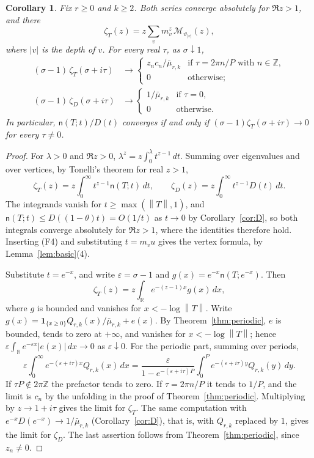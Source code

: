 \documentclass[11pt]{article}
\newtheorem{corollary}[theorem]{Corollary}
\theoremstyle{definition}
\theoremstyle{remark}
\newcommand{\Z}{\mathbb Z}
\newcommand{\R}{\mathbb R}
\newcommand{\one}{\mathbf 1}
\newcommand{\ncount}{\mathsf n}
\newcommand{\norm}[1]{\left\lVert #1\right\rVert}
\begin{document}
\begin{corollary}\label{cor:zeta}
Fix $r\ge0$ and $k\ge2$. Both series converge absolutely for $\Re z>1$,
and there
\[
 \zeta_T(z)=z\sum_vm_v^z\,\mathcal M_{\vartheta_{|v|}}(z),
\]
where $|v|$ is the depth of $v$. For every real $\tau$, as $\sigma\downarrow1$,
\begin{align*}
 (\sigma-1)\,\zeta_T(\sigma+i\tau)&\longrightarrow
 \begin{cases}z_nc_n/\bar\mu_{r,k}&\text{if }\tau=2\pi n/P\text{ with }n\in\Z,\\
 0&\text{otherwise};\end{cases}\\
 (\sigma-1)\,\zeta_D(\sigma+i\tau)&\longrightarrow
 \begin{cases}1/\bar\mu_{r,k}&\text{if }\tau=0,\\
 0&\text{otherwise}.\end{cases}
\end{align*}
In particular, $\ncount(T;t)/D(t)$ converges if and only if
$(\sigma-1)\zeta_T(\sigma+i\tau)\to0$ for every $\tau\ne0$.
\end{corollary}
\begin{proof}
For $\lambda>0$ and $\Re z>0$, $\lambda^z=z\int_0^\lambda t^{z-1}\,dt$.
Summing over eigenvalues and over vertices, by Tonelli's theorem for
real $z>1$,
\[
 \zeta_T(z)=z\int_0^\infty t^{z-1}\ncount(T;t)\,dt,\qquad
 \zeta_D(z)=z\int_0^\infty t^{z-1}D(t)\,dt.
\]
The integrands vanish for $t\ge\max(\norm T,1)$, and
$\ncount(T;t)\le D((1-\theta)t)=O(1/t)$ as $t\to0$ by
Corollary~\ref{cor:D}, so both integrals converge absolutely for
$\Re z>1$, where the identities therefore hold. Inserting (F4) and
substituting $t=m_vu$ gives the vertex formula, by Lemma~\ref{lem:basic}(4).

Substitute $t=e^{-x}$, and write $\varepsilon=\sigma-1$ and
$g(x)=e^{-x}\ncount(T;e^{-x})$. Then
\[
 \zeta_T(z)=z\int_\R e^{-(z-1)x}g(x)\,dx,
\]
where $g$ is bounded and vanishes for $x<-\log\norm T$. Write
$g(x)=\one_{\{x\ge0\}}Q_{r,k}(x)/\bar\mu_{r,k}+e(x)$. By
Theorem~\ref{thm:periodic}, $e$ is bounded, tends to zero at $+\infty$,
and vanishes for $x<-\log\norm T$; hence
$\varepsilon\int_\R e^{-\varepsilon x}|e(x)|\,dx\to0$ as
$\varepsilon\downarrow0$. For the periodic part, summing over periods,
\[
 \varepsilon\int_0^\infty e^{-(\varepsilon+i\tau)x}Q_{r,k}(x)\,dx
 =\frac{\varepsilon}{1-e^{-(\varepsilon+i\tau)P}}
 \int_0^Pe^{-(\varepsilon+i\tau)y}Q_{r,k}(y)\,dy .
\]
If $\tau P\notin2\pi\Z$ the prefactor tends to zero. If $\tau=2\pi n/P$
it tends to $1/P$, and the limit is $c_n$ by the unfolding in the proof
of Theorem~\ref{thm:periodic}. Multiplying by $z\to1+i\tau$ gives the
limit for $\zeta_T$. The same computation with
$e^{-x}D(e^{-x})\to1/\bar\mu_{r,k}$ (Corollary~\ref{cor:D}), that is,
with $Q_{r,k}$ replaced by $1$, gives the limit for $\zeta_D$. The last
assertion follows from Theorem~\ref{thm:periodic}, since $z_n\ne0$.
\end{proof}
\end{document}

